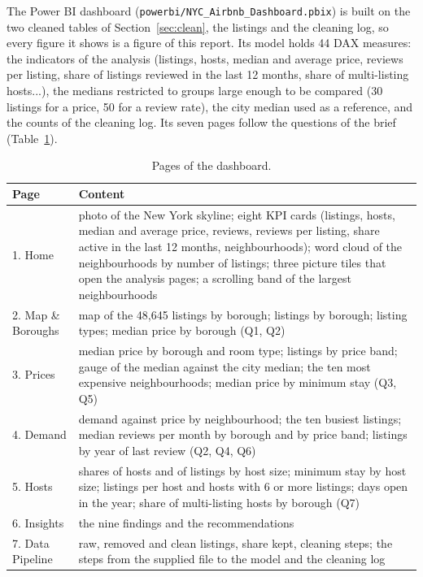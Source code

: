 \documentclass[12pt,a4paper]{article}
\begin{document}
The Power BI dashboard (\nolinkurl{powerbi/NYC_Airbnb_Dashboard.pbix}) is built on the two cleaned
tables of Section~\ref{sec:clean}, the listings and the cleaning log, so every figure it shows is a
figure of this report. Its model holds 44 DAX measures: the indicators of the analysis (listings,
hosts, median and average price, reviews per listing, share of listings reviewed in the last 12
months, share of multi-listing hosts...), the medians restricted to groups large enough to be
compared (30 listings for a price, 50 for a review rate), the city median used as a reference, and
the counts of the cleaning log. Its seven pages follow the questions of the brief
(Table~\ref{tab:pages}).

\begin{table}[H]\centering\small
\caption{\label{tab:pages}Pages of the dashboard.}
\begin{tabularx}{\linewidth}{@{}lX@{}}
\toprule
Page & Content\\\midrule
1. Home & photo of the New York skyline; eight KPI cards (listings, hosts, median and average price, reviews, reviews per listing, share active in the last 12 months, neighbourhoods); word cloud of the neighbourhoods by number of listings; three picture tiles that open the analysis pages; a scrolling band of the largest neighbourhoods\\
2. Map \& Boroughs & map of the 48{,}645 listings by borough; listings by borough; listing types; median price by borough (Q1, Q2)\\
3. Prices & median price by borough and room type; listings by price band; gauge of the median against the city median; the ten most expensive neighbourhoods; median price by minimum stay (Q3, Q5)\\
4. Demand & demand against price by neighbourhood; the ten busiest listings; median reviews per month by borough and by price band; listings by year of last review (Q2, Q4, Q6)\\
5. Hosts & shares of hosts and of listings by host size; minimum stay by host size; listings per host and hosts with 6 or more listings; days open in the year; share of multi-listing hosts by borough (Q7)\\
6. Insights & the nine findings and the recommendations\\
7. Data Pipeline & raw, removed and clean listings, share kept, cleaning steps; the steps from the supplied file to the model and the cleaning log\\
\bottomrule
\end{tabularx}
\end{table}
\end{document}
